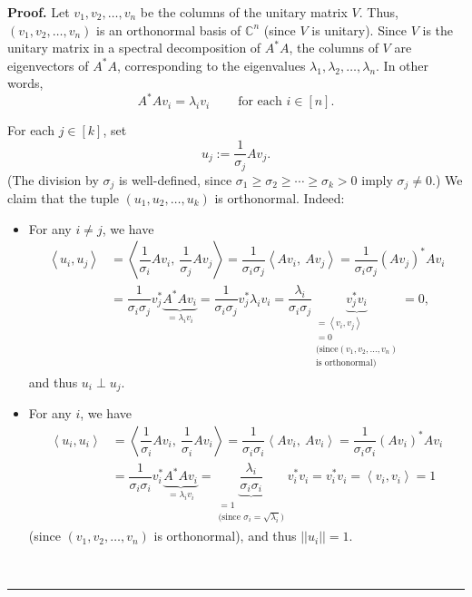 \documentclass[numbers=enddot,12pt,final,onecolumn,notitlepage]{scrartcl}%
\numberwithin{exer}{subsection}
\theoremstyle{definition}
\newenvironment{proof}[1][Proof]{\noindent\textbf{#1.} }{\ \rule{0.5em}{0.5em}}
\begin{document}
\begin{proof}
Let $v_{1},v_{2},\ldots,v_{n}$ be the columns of the unitary matrix $V$. Thus,
$\left(  v_{1},v_{2},\ldots,v_{n}\right)  $ is an orthonormal basis of
$\mathbb{C}^{n}$ (since $V$ is unitary). Since $V$ is the unitary matrix in a
spectral decomposition of $A^{\ast}A$, the columns of $V$ are eigenvectors of
$A^{\ast}A$, corresponding to the eigenvalues $\lambda_{1},\lambda_{2}%
,\ldots,\lambda_{n}$. In other words,%
\[
A^{\ast}Av_{i}=\lambda_{i}v_{i}\ \ \ \ \ \ \ \ \ \ \text{for each }i\in\left[
n\right]  .
\]


For each $j\in\left[  k\right]  $, set%
\[
u_{j}:=\dfrac{1}{\sigma_{j}}Av_{j}.
\]
(The division by $\sigma_{j}$ is well-defined, since $\sigma_{1}\geq\sigma
_{2}\geq\cdots\geq\sigma_{k}>0$ imply $\sigma_{j}\neq0$.) We claim that the
tuple $\left(  u_{1},u_{2},\ldots,u_{k}\right)  $ is orthonormal. Indeed:

\begin{itemize}
\item For any $i\neq j$, we have%
\begin{align*}
\left\langle u_{i},u_{j}\right\rangle  &  =\left\langle \dfrac{1}{\sigma_{i}%
}Av_{i},\ \dfrac{1}{\sigma_{j}}Av_{j}\right\rangle =\dfrac{1}{\sigma_{i}%
\sigma_{j}}\left\langle Av_{i},\ Av_{j}\right\rangle =\dfrac{1}{\sigma
_{i}\sigma_{j}}\left(  Av_{j}\right)  ^{\ast}Av_{i}\\
&  =\dfrac{1}{\sigma_{i}\sigma_{j}}v_{j}^{\ast}\underbrace{A^{\ast}Av_{i}%
}_{=\lambda_{i}v_{i}}=\dfrac{1}{\sigma_{i}\sigma_{j}}v_{j}^{\ast}\lambda
_{i}v_{i}=\dfrac{\lambda_{i}}{\sigma_{i}\sigma_{j}}\underbrace{v_{j}^{\ast
}v_{i}}_{\substack{=\left\langle v_{i},v_{j}\right\rangle \\=0\\\text{(since
}\left(  v_{1},v_{2},\ldots,v_{n}\right)  \\\text{is orthonormal)}}}=0,
\end{align*}
and thus $u_{i}\perp u_{j}$.

\item For any $i$, we have%
\begin{align*}
\left\langle u_{i},u_{i}\right\rangle  &  =\left\langle \dfrac{1}{\sigma_{i}%
}Av_{i},\ \dfrac{1}{\sigma_{i}}Av_{i}\right\rangle =\dfrac{1}{\sigma_{i}%
\sigma_{i}}\left\langle Av_{i},\ Av_{i}\right\rangle =\dfrac{1}{\sigma
_{i}\sigma_{i}}\left(  Av_{i}\right)  ^{\ast}Av_{i}\\
&  =\dfrac{1}{\sigma_{i}\sigma_{i}}v_{i}^{\ast}\underbrace{A^{\ast}Av_{i}%
}_{=\lambda_{i}v_{i}}=\underbrace{\dfrac{\lambda_{i}}{\sigma_{i}\sigma_{i}}%
}_{\substack{=1\\\text{(since }\sigma_{i}=\sqrt{\lambda_{i}}\text{)}}%
}v_{i}^{\ast}v_{i}=v_{i}^{\ast}v_{i}=\left\langle v_{i},v_{i}\right\rangle =1
\end{align*}
(since $\left(  v_{1},v_{2},\ldots,v_{n}\right)  $ is orthonormal), and thus
$\left\vert \left\vert u_{i}\right\vert \right\vert =1$.
\end{itemize}


\end{proof}
\end{document}
